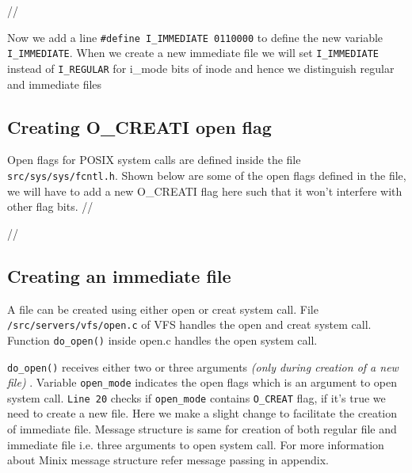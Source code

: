 \begin{small}

\end{small}

//

Now we add a line \texttt{\#define I\_IMMEDIATE 0110000} to define the new variable \texttt{I\_IMMEDIATE}. When we create a new immediate file we will set \texttt{I\_IMMEDIATE} instead of \texttt{I\_REGULAR} for i\_mode bits of inode and hence we distinguish regular and immediate files

\subsection{Creating O\_CREATI open flag}

Open flags for POSIX system calls are defined inside the file \texttt{src/sys/sys/fcntl.h}. Shown below are some of the open flags defined in the file, we will have to add a new O\_CREATI flag here such that it won't interfere with other flag bits.
//

\begin{small}

\end{small}
//

\subsection{Creating an immediate file}
A file can be created using either open or creat system call. File \texttt{/src/servers/vfs/open.c} of VFS handles the open and creat system call. \\

Function \texttt{do\_open()} inside open.c handles the open system call.

\begin{small}

\end{small}

\texttt{do\_open()} receives either two or three arguments \emph{(only during creation of a new file)} . Variable \texttt{open\_mode} indicates the open flags which is an argument to open system call. \texttt{Line 20} checks if \texttt{open\_mode} contains \texttt{O\_CREAT} flag, if it's true we need to create a new file. Here we make a slight change to facilitate the creation of immediate file. Message structure is same for creation of both regular file and immediate file i.e. three arguments to open system call. For more information about Minix message structure refer message passing in appendix.
 \\

